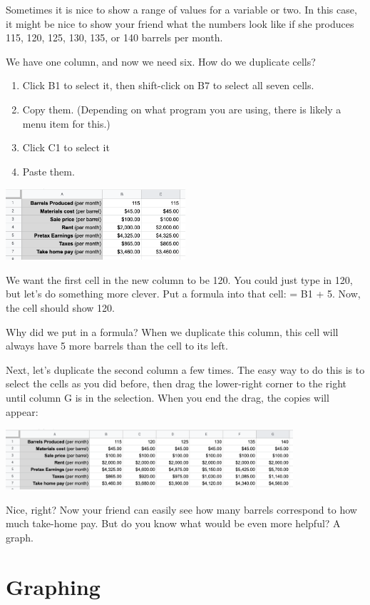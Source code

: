 Sometimes it is nice to show a range of values for a variable or two.
In this case, it might be nice to show your friend what the numbers
look like if she produces 115, 120, 125, 130, 135, or 140 barrels per
month.

We have one column, and now we need six. How do we duplicate cells?
\begin{enumerate}
\item Click B1 to select it, then shift-click on B7 to select all seven cells.
\item Copy them. (Depending on what program you are using, there is likely a menu item for this.)
\item Click C1 to select it
\item Paste them.
\end{enumerate}

\includegraphics[width=0.5\textwidth]{BarrelCopyPaste.png}

We want the first cell in the new column to be 120. You could just
type in 120, but let's do something more clever. Put a formula into that
cell: = B1 + 5.  Now, the cell should show 120.

Why did we put in a formula? When we duplicate this column, this cell
will always have 5 more barrels than the cell to its left.

Next, let's duplicate the second column a few times. The easy way to do
this is to select the cells as you did before, then drag the lower-right
corner to the right until column G is in the selection. When you end
the drag, the copies will appear:

\includegraphics[width=0.8\textwidth]{BarrelDragPaste.png}

Nice, right? Now your friend can easily see how many barrels
correspond to how much take-home pay. But do you know what would be even more helpful? A graph.

\section{Graphing}

